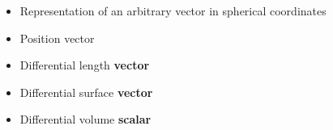 \begin{ELjoin}

\begin{itemize}
\tightlist
\item
  Representation of an arbitrary vector  in spherical coordinates
\end{itemize}

\begin{ELimportant}{}


\end{ELimportant}

\end{ELjoin}

\begin{ELunit}

\begin{itemize}
\tightlist
\item
  Position vector
\end{itemize}



\begin{itemize}
\tightlist
\item
  Differential length \ELim{\ELto} \textbf{vector}
\end{itemize}


\begin{itemize}
\tightlist
\item
  Differential surface \ELim{\ELto} \textbf{vector}
\end{itemize}


\begin{itemize}
\tightlist
\item
  Differential volume \ELim{\ELto} \textbf{scalar}
\end{itemize}




\end{ELunit}
